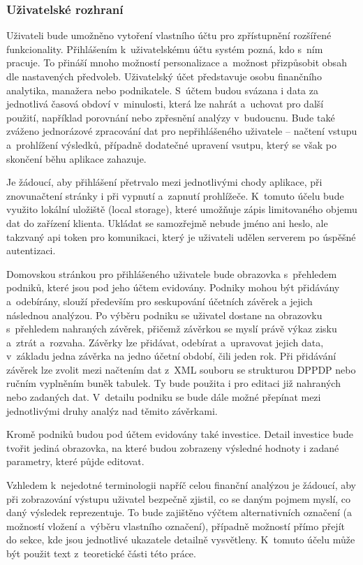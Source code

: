 \pagebreak
\subsubsection{Uživatelské rozhraní}


Uživateli bude umožněno vytoření vlastního účtu pro zpřístupnění rozšířené funkcionality. Přihlášením k~uživatelskému účtu systém pozná, kdo s~ním pracuje. To přináší mnoho možností personalizace a~možnost přizpůsobit obsah dle nastavených předvoleb. Uživatelský účet představuje osobu finančního analytika, manažera nebo podnikatele. S~účtem budou svázana i data za jednotlivá časová obdoví v~minulosti, která lze nahrát a~uchovat pro další použití, například porovnání nebo zpřesnění analýzy v~budoucnu. Bude také zváženo jednorázové zpracování dat pro nepřihlášeného uživatele -- načtení vstupu a~prohlížení výsledků, případně dodatečné upravení vsutpu, který se však po skončení běhu aplikace zahazuje.

Je žádoucí, aby přihlášení přetrvalo mezi jednotlivými chody aplikace, při znovunačtení stránky i při vypnutí a~zapnutí prohlížeče. K~tomuto účelu bude využito lokální uložiště (local storage), které umožňuje zápis limitovaného objemu dat do zařízení klienta. Ukládat se samozřejmě nebude jméno ani heslo, ale takzvaný api token pro komunikaci, který je uživateli udělen serverem po úspěšné autentizaci.

Domovskou stránkou pro přihlášeného uživatele bude obrazovka s~přehledem podniků, které jsou pod jeho účtem evidovány. Podniky mohou být přidávány a~odebírány, slouží především pro seskupování účetních závěrek a jejich následnou analýzou. Po výběru podniku se uživatel dostane na obrazovku s~přehledem nahraných závěrek, přičemž závěrkou se myslí právě výkaz zisku a~ztrát a~rozvaha. Závěrky lze přidávat, odebírat a~upravovat jejich data, v~základu jedna závěrka na jedno účetní období, čili jeden rok. Při přidávání závěrek lze zvolit mezi načtením dat z~XML souboru se strukturou DPPDP nebo ručním vyplněním buněk tabulek. Ty bude použita i pro editaci již nahraných nebo zadaných dat. V~detailu podniku se bude dále možné přepínat mezi jednotlivými druhy analýz nad těmito závěrkami.

Kromě podniků budou pod účtem evidovány také investice. Detail investice bude tvořit jediná obrazovka, na které budou zobrazeny výsledné hodnoty i zadané parametry, které půjde editovat.

Vzhledem k~nejedotné terminologii napříč celou finanční analýzou je žádoucí, aby při zobrazování výstupu uživatel bezpečně zjistil, co se daným pojmem myslí, co daný výsledek reprezentuje. To bude zajištěno výčtem alternativních označení (a možností vložení a~výběru vlastního označení), případně možností přímo přejít do sekce, kde jsou jednotlivé ukazatele detailně vysvětleny. K~tomuto účelu může být použit text z~teoretické části této práce.

